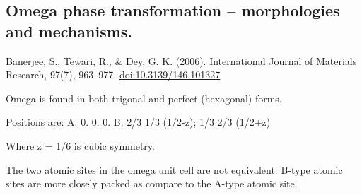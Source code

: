 \documentclass[11pt]{article}
\begin{document}
\subsection{Omega phase transformation – morphologies and mechanisms.}
\label{sec:org0a405f5}
Banerjee, S., Tewari, R., \& Dey, G. K. (2006). 
International Journal of Materials Research, 97(7),
963–977. \href{https://doi.org/10.3139/146.101327}{doi:10.3139/146.101327} 
\cite{Banerjee_2006}


Omega is found in both trigonal and perfect (hexagonal) forms. 

Positions are:
A: 0. 0. 0. 
B: 2/3 1/3 (1/2-z); 1/3 2/3 (1/2+z)

Where z = 1/6 is cubic symmetry. 

The two atomic sites in the omega unit cell are not equivalent.  B-type atomic
sites are more closely packed as compare to the A-type atomic site.
\end{document}
